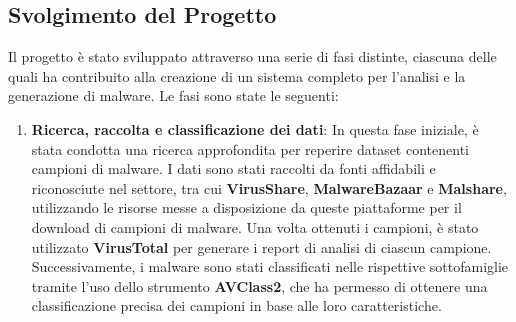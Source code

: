 \subsection{Svolgimento del Progetto}
Il progetto è stato sviluppato attraverso una serie di fasi distinte, ciascuna delle quali ha contribuito alla creazione di un sistema completo per l'analisi e la generazione di malware. Le fasi sono state le seguenti:
\begin{enumerate}
    \item \textbf{Ricerca, raccolta e classificazione dei dati}: In questa fase iniziale, è stata condotta una ricerca approfondita per reperire dataset contenenti campioni di malware. I dati sono stati raccolti da fonti affidabili e riconosciute nel settore, tra cui \textbf{VirusShare}, \textbf{MalwareBazaar} e \textbf{Malshare}, utilizzando le risorse messe a disposizione da queste piattaforme per il download di campioni di malware. Una volta ottenuti i campioni, è stato utilizzato \textbf{VirusTotal} per generare i report di analisi di ciascun campione. Successivamente, i malware sono stati classificati nelle rispettive sottofamiglie tramite l'uso dello strumento \textbf{AVClass2}, che ha permesso di ottenere una classificazione precisa dei campioni in base alle loro caratteristiche.
    

\end{enumerate}
